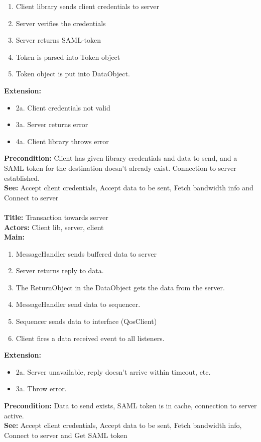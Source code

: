 		\begin{enumerate}
			\item Client library sends client credentials to server
			\item Server verifies the credentials
			\item Server returns SAML-token
			\item Token is parsed into Token object
			\item Token object is put into DataObject.
		\end{enumerate}
		\textbf{Extension:}
		\begin{itemize}
			  \item 2a. Client credentials not valid
			  \item 3a. Server returns error
			  \item 4a. Client library throws error
		\end{itemize}
		\textbf{Precondition:} Client has given library credentials and data to send, and a SAML token for the destination doesn’t already exist. Connection to server established. \\
		\textbf{See:} Accept client credentials, Accept data to be sent, Fetch bandwidth info and Connect to server
		\\\\
		\textbf{Title:} Transaction towards server \\
		\textbf{Actors:} Client lib, server, client \\
		\textbf{Main:}
		\begin{enumerate}
			\item MessageHandler sends buffered data to server
			\item Server returns reply to data.
			\item The ReturnObject in the DataObject gets the data from the server.
			\item MessageHandler send data to sequencer.
			\item Sequencer sends data to interface (QosClient)
			\item Client fires a data received event to all listeners.
		\end{enumerate}
		\textbf{Extension:}
		\begin{itemize}
			 \item[] 2a. Server unavailable, reply doesn’t arrive within timeout, etc.
			 \item[] 3a. Throw error.
		\end{itemize}
		\textbf{Precondition:} Data to send exists, SAML token is in cache, connection to server active.\\
		\textbf{See:} Accept client credentials, Accept data to be sent, Fetch bandwidth info, Connect to server and Get SAML token
		
